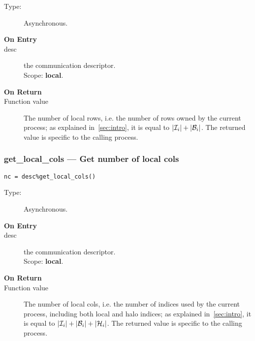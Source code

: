 \begin{description}
\item[Type:] Asynchronous.
\item[\bf On Entry]
\item[desc] the communication descriptor.\\
Scope: {\bf local}.\\
\end{description}

\begin{description}
\item[\bf On Return]
\item[Function value] The number of local rows, i.e. the number of
  rows owned by the current process; as explained in~\ref{sec:intro},
  it is equal to $|{\cal I}_i| + |{\cal B}_i|$. The returned value is
  specific to the calling process. 
\end{description}


\subsubsection*{get\_local\_cols --- Get number of local cols}

\begin{verbatim}
nc = desc%get_local_cols()
\end{verbatim}

\begin{description}
\item[Type:] Asynchronous.
\item[\bf On Entry]
\item[desc] the communication descriptor.\\
Scope: {\bf local}.\\
\end{description}

\begin{description}
\item[\bf On Return]
\item[Function value] The number of local cols, i.e. the number of
  indices used by the current process, including both local and halo
  indices; as explained in~\ref{sec:intro}, 
  it is equal to  $|{\cal I}_i| + |{\cal B}_i| +|{\cal H}_i|$. The
  returned value is specific to the calling process. 
\end{description}


